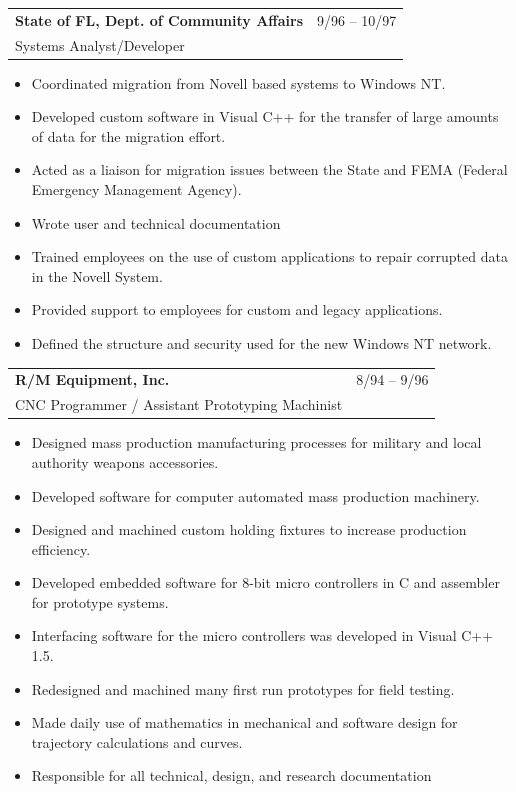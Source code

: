 \documentclass[10pt]{report}
\begin{document}
\noindent
\begin{tabular}{ L{.5\textwidth}  R{.4\textwidth} }
\textbf{\large State of FL, Dept. of Community Affairs}  & 9/96 -- 10/97 \\
Systems Analyst/Developer &
\end{tabular}

\begin{itemize}
\item Coordinated migration from Novell based systems to Windows NT.
\item Developed custom software in Visual C++ for the transfer of large amounts of data for the migration effort.
\item Acted as a liaison for migration issues between the State and FEMA (Federal Emergency Management Agency).
\item Wrote user and technical documentation
\item Trained employees on the use of custom applications to repair corrupted data in the Novell System.
\item Provided support to employees for custom and legacy applications.
\item Defined the structure and security used for the new Windows NT network.
\end{itemize}
\bigskip

\noindent
\begin{tabular}{ L{.5\textwidth}  R{.4\textwidth} }
\textbf{\large R/M Equipment, Inc.}  & 8/94 -- 9/96 \\
CNC Programmer / Assistant Prototyping Machinist &
\end{tabular}

\begin{itemize}
\item Designed mass production manufacturing processes for military and local authority weapons accessories.
\item Developed software for computer automated mass production machinery.
\item Designed and machined custom holding fixtures to increase production efficiency.
\item Developed embedded software for 8-bit micro controllers in C and assembler for prototype systems.
\item Interfacing software for the micro controllers was developed in Visual C++ 1.5.
\item Redesigned and machined many first run prototypes for field testing.
\item Made daily use of mathematics in mechanical and software design for trajectory calculations and curves.
\item Responsible for all technical, design, and research documentation  
\end{itemize}
\bigskip
\end{document}
